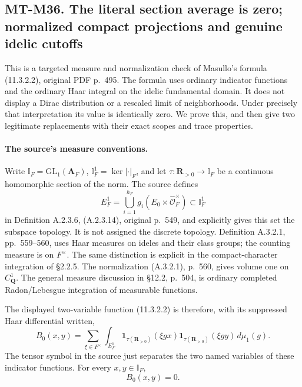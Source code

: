 \subsection*{MT-M36. The literal section average is zero;
normalized compact projections and genuine idelic cutoffs}

This is a targeted measure and normalization check of
Masullo's formula (11.3.2.2), original PDF p.~495.
The formula uses ordinary indicator functions and the
ordinary Haar integral on the idelic fundamental domain.
It does not display a Dirac distribution or a rescaled
limit of neighborhoods.  Under precisely that
interpretation its value is identically zero.
We prove this, and then give two legitimate replacements
with their exact scopes and trace properties.

\paragraph{The source's measure conventions.}
Write $\mathbb I_F=\mathrm{GL}_1(\mathbf A_F)$,
$\mathbb I_F^1=\ker|\cdot|_F$, and let
$\tau:\mathbf R_{>0}\to\mathbb I_F$ be a continuous
homomorphic section of the norm.  The source defines
\[
 E_F^1=\bigcup_{i=1}^{h_F}
              g_i(E_0\times\widehat{\mathcal O}_F^\times)
                         \subset\mathbb I_F^1
 \tag{M36.1}
\]
in Definition A.2.3.6, (A.2.3.14), original p.~549,
and explicitly gives this set the subspace topology.
It is not assigned the discrete topology.  Definition
A.3.2.1, pp.~559--560, uses Haar measures on ideles
and their class groups; the counting measure is on
$F^\times$.  The same distinction is explicit in
the compact-character integration of \S2.2.5.
The normalization (A.3.2.1), p.~560, gives volume one
on $C_{\mathbf Q}^1$.  The general measure discussion
in \S12.2, p.~504, is ordinary completed Radon/Lebesgue
integration of measurable functions.

The displayed two-variable function (11.3.2.2) is
therefore, with its suppressed Haar differential written,
\[
 B_0(x,y)=\sum_{\xi\in F^\times}\int_{E_F^1}
    \mathbf1_{\tau(\mathbf R_{>0})}(\xi gx)
    \mathbf1_{\tau(\mathbf R_{>0})}(\xi gy)\,d\mu_1(g).
 \tag{M36.2}
\]
The tensor symbol in the source just separates the two
named variables of these indicator functions.
For every $x,y\in\mathbb I_F$,
\[
                              B_0(x,y)=0.
 \tag{M36.3}
\]

